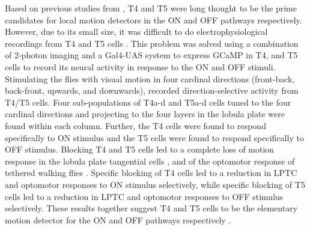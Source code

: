 Based on previous studies from \parencite{Fischbach1989, Buchner1984}, T4 and T5 were long thought to be the prime candidates for local motion detectors in the ON and OFF pathways respectively. However, due to its small size, it was difficult to do electrophysiological recordings from T4 and T5 cells \parencite{Douglass1996}. This problem was solved using a combination of 2-photon imaging and a Gal4-UAS system to express GCaMP in T4, and T5 cells to record its neural activity in response to the ON and OFF stimuli. Stimulating the flies with visual motion in four cardinal directions (front-back, back-front, upwards, and downwards), \cite{Maisak2013} recorded direction-selective activity from T4/T5 cells. Four sub-populations of T4a-d and T5a-d cells tuned to the four cardinal directions and projecting to the four layers in the lobula plate were found within each column. Further, the T4 cells were found to respond specifically to ON stimulus and the T5 cells were found to respond specifically to OFF stimulus. Blocking T4 and T5 cells led to a complete loss of motion response in the lobula plate tangential cells \parencite{Schnell2012}, and of the optomotor response of tethered walking flies \parencite{Bahl2013}. Specific blocking of T4 cells led to a reduction in LPTC and optomotor responses to ON stimulus selectively, while specific blocking of T5 cells led to a reduction in LPTC and optomotor responses to OFF stimulus selectively. These results together suggest T4 and T5 cells to be the elementary motion detector for the ON and OFF pathways respectively \parencite{Maisak2013}.      

